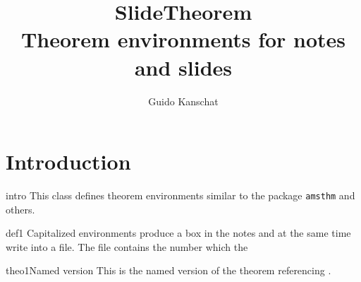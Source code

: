 \documentclass{article}
\title{SlideTheorem\\\large Theorem environments for notes and slides}
\author{Guido Kanschat}
\numberwithin{slidetheorem}{section}
\begin{document}
\maketitle
\section{Introduction}

\begin{Remark}{intro}
  This class defines theorem environments similar to the package \texttt{amsthm} and others.
\end{Remark}

\begin{Definition}{def1}
  Capitalized environments produce a box in the notes and at the same
  time write into a file. The file contains the number which the 
\end{Definition}


\begin{Theorem*}{theo1}{Named version}
  This is the named version of the theorem referencing .
\end{Theorem*}
\end{document}
